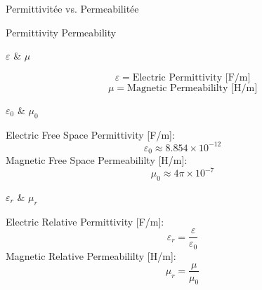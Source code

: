 \begin{frame}{Permittivitée vs. Permeabilitée}
    \begin{twocolumns}[0.5]
        \leftcol
            Permittivity
        \rightcol
            Permeability
    \end{twocolumns}
\end{frame}

\begin{frame}{$\varepsilon$ \& $\mu$}
    \begin{twocolumns}[0.5]
        \leftcol
            \begin{equation}
                \varepsilon = \text{Electric Permittivity [F/m]}
            \end{equation}
            \begin{equation}
                \mu = \text{Magnetic Permeabililty [H/m]}
            \end{equation}
        \rightcol
    \end{twocolumns}
\end{frame}

\begin{frame}{$\varepsilon_0$ \& $\mu_0$}
    \begin{twocolumns}[0.5]
        \leftcol
            Electric Free Space Permittivity [F/m]:
            \begin{equation}
                \varepsilon_0 \approx 8.854\times 10^{-12}
            \end{equation}
            Magnetic Free Space Permeabililty [H/m]:
            \begin{equation}
                \mu_0 \approx 4\pi \times 10^{-7}
            \end{equation}
        \rightcol
    \end{twocolumns}
\end{frame}

\begin{frame}{$\varepsilon_r$ \& $\mu_r$}
    \begin{twocolumns}[0.5]
        \leftcol
            Electric Relative Permittivity [F/m]:
            \begin{equation}
                \varepsilon_r =\frac{\varepsilon}{\varepsilon_0}
            \end{equation}
            Magnetic Relative Permeabililty [H/m]:
            \begin{equation}
                \mu_r =\frac{\mu}{\mu_0}
            \end{equation}
        \rightcol
    \end{twocolumns}
\end{frame}

